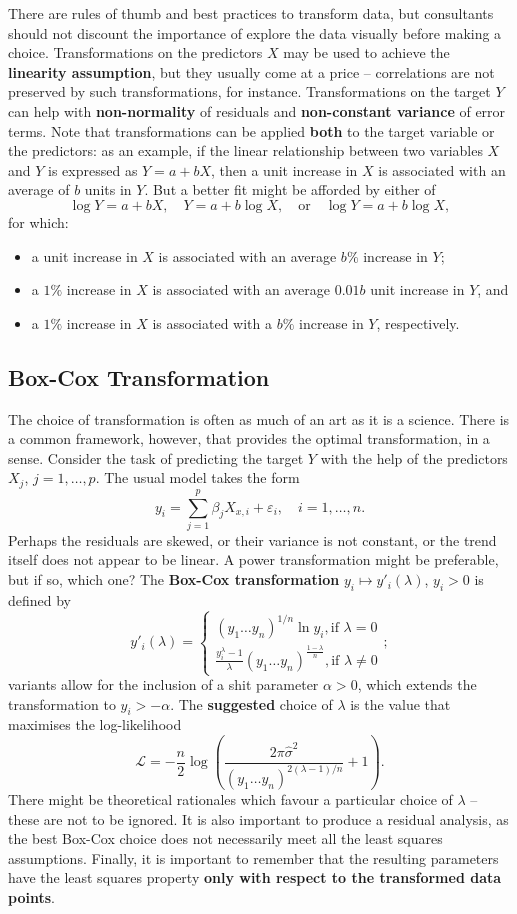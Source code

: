 \afterpage{\FloatBarrier}
There are rules of thumb and best practices to transform data, but consultants should not discount the importance of explore the data visually before making a choice. \newl Transformations on the predictors $X$ may be used to achieve the \textbf{linearity assumption}, but they usually come at a price -- correlations are not preserved by such transformations, for instance. Transformations on the target $Y$ can help with \textbf{non-normality} of residuals and \textbf{non-constant variance} of error terms. Note that transformations can be applied \textbf{both} to the target variable or the predictors: as an example, if the linear relationship between two variables $X$ and $Y$ is expressed as $Y=a+bX$, then a unit increase in $X$ is associated with an average of $b$ units in $Y$. But a better fit might be afforded by either of $$\log Y = a+bX,\quad Y=a+b\log X,\quad \mbox{or}\quad  \log Y = a+b\log X,$$ for which:
\begin{itemize}[noitemsep]
\item a unit increase in $X$ is associated with an average $b\%$ increase in $Y$;
\item a $1\%$ increase in $X$ is associated with an average $0.01b$ unit increase in $Y$, and
\item a $1\%$ increase in $X$ is associated with a $b\%$ increase in $Y$, respectively. 
\end{itemize}
\subsection{Box-Cox Transformation} The choice of transformation is often as much of an art as it is a science. There is a common  framework, however, that provides the  optimal transformation, in a sense. Consider the task of predicting the target $Y$ with the help of the predictors $X_j$, $j=1,\ldots, p$. The usual model takes the form $$y_i=\sum_{j=1}^p\beta_jX_{x,i}+\varepsilon_i,\quad i=1,\ldots, n.$$ Perhaps the residuals are skewed, or their variance is not constant, or the trend itself does not appear to be linear. A power transformation might be preferable, but if so,  which one? \newl The \textbf{Box-Cox transformation} $y_i\mapsto y'_i(\lambda)$, $y_i>0$ is defined by  $$y'_i(\lambda)=\begin{cases}(y_1 \ldots   y_n)^{1/n}\ln y_i, \text{if }\lambda=0 \\ 
\frac{y_i^{\lambda}-1}{\lambda}(y_1 \ldots   y_n)^{\frac{1-\lambda}{n}}, \text{if }\lambda\neq 0
\end{cases};$$
variants allow for the inclusion of a shit parameter $\alpha>0$, which extends the transformation to $y_i>-\alpha$. The \textbf{suggested} choice of $\lambda$ is the value that maximises the log-likelihood $$\mathcal{L}=-\frac{n}{2}\log\left(\frac{2\pi\hat{\sigma}^2}{(y_1 \ldots   y_n)^{2(\lambda-1)/n}}+1\right).$$
There might be theoretical rationales which favour a particular choice of $\lambda$ -- these are not to be ignored. It is also important to produce a residual analysis, as the best Box-Cox choice does not necessarily meet all the least squares assumptions. Finally, it is important to remember that the resulting parameters have the least squares property \textbf{only with respect to the transformed data points}. 
